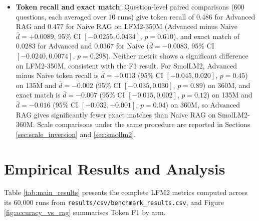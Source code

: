 \documentclass[10pt]{article}
\begin{document}
\begin{itemize}
    \item \textbf{Token recall and exact match}: Question-level paired comparisons (600 questions, each averaged over 10 runs) give token recall of $0.486$ for Advanced RAG and $0.477$ for Naive RAG on LFM2-350M (Advanced minus Naive $\bar{d}=+0.0089$, 95\% CI $[-0.0255, 0.0434]$, $p=0.610$), and exact match of $0.0283$ for Advanced and $0.0367$ for Naive ($\bar{d}=-0.0083$, 95\% CI $[-0.0240, 0.0074]$, $p=0.298$). Neither metric shows a significant difference on LFM2-350M, consistent with the F1 result. For SmolLM2, Advanced minus Naive token recall is $\bar{d}=-0.013$ (95\% CI $[-0.045, 0.020]$, $p=0.45$) on 135M and $\bar{d}=-0.002$ (95\% CI $[-0.035, 0.030]$, $p=0.89$) on 360M, and exact match is $\bar{d}=-0.007$ (95\% CI $[-0.015, 0.002]$, $p=0.12$) on 135M and $\bar{d}=-0.016$ (95\% CI $[-0.032, -0.001]$, $p=0.04$) on 360M, so Advanced RAG gives significantly fewer exact matches than Naive RAG on SmolLM2-360M. Scale comparisons under the same procedure are reported in Sections \ref{sec:scale_inversion} and \ref{sec:smollm2}.
\end{itemize}

\section{Empirical Results and Analysis}
\label{sec:results}

Table \ref{tab:main_results} presents the complete LFM2 metrics computed across its 60,000 runs from \texttt{results/csv/benchmark\_results.csv}, and Figure \ref{fig:accuracy_vs_rag} summarises Token F1 by arm.
\end{document}

